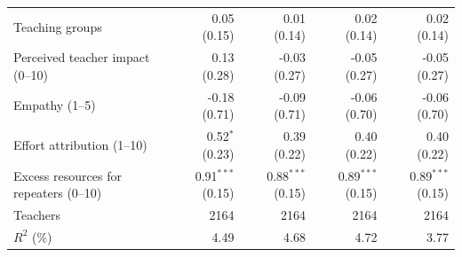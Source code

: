 \begin{tabular}{p{5.6cm}rrrr}
Teaching groups & \shortstack{0.05\\{\scriptsize (0.15)}} & \shortstack{0.01\\{\scriptsize (0.14)}} & \shortstack{0.02\\{\scriptsize (0.14)}} & \shortstack{0.02\\{\scriptsize (0.14)}} \\
Perceived teacher impact (0--10) & \shortstack{0.13\\{\scriptsize (0.28)}} & \shortstack{-0.03\\{\scriptsize (0.27)}} & \shortstack{-0.05\\{\scriptsize (0.27)}} & \shortstack{-0.05\\{\scriptsize (0.27)}} \\
Empathy (1--5) & \shortstack{-0.18\\{\scriptsize (0.71)}} & \shortstack{-0.09\\{\scriptsize (0.71)}} & \shortstack{-0.06\\{\scriptsize (0.70)}} & \shortstack{-0.06\\{\scriptsize (0.70)}} \\
Effort attribution (1--10) & \shortstack{0.52$^{*}$\\{\scriptsize (0.23)}} & \shortstack{0.39\\{\scriptsize (0.22)}} & \shortstack{0.40\\{\scriptsize (0.22)}} & \shortstack{0.40\\{\scriptsize (0.22)}} \\
Excess resources for repeaters (0--10) & \shortstack{0.91$^{***}$\\{\scriptsize (0.15)}} & \shortstack{0.88$^{***}$\\{\scriptsize (0.15)}} & \shortstack{0.89$^{***}$\\{\scriptsize (0.15)}} & \shortstack{0.89$^{***}$\\{\scriptsize (0.15)}} \\
Teachers & 2164 & 2164 & 2164 & 2164 \\
$R^2$ (\%) & 4.49 & 4.68 & 4.72 & 3.77 \\
\bottomrule
\end{tabular}
